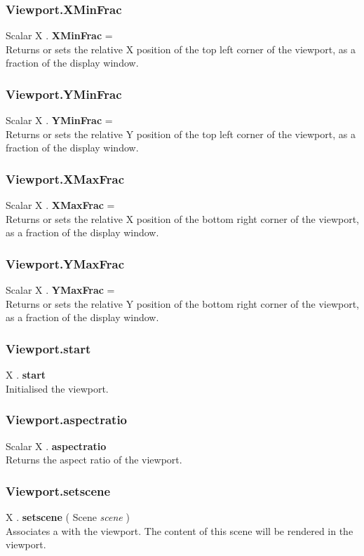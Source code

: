 \subsubsection{Viewport.XMinFrac \label{F:Viewport:XMinFrac}}
Scalar X . \textbf{XMinFrac} = \\
Returns or sets the relative X position of the top left corner of the viewport, as a fraction of the display window.

\subsubsection{Viewport.YMinFrac \label{F:Viewport:YMinFrac}}
Scalar X . \textbf{YMinFrac} = \\
Returns or sets the relative Y position of the top left corner of the viewport, as a fraction of the display window.

\subsubsection{Viewport.XMaxFrac \label{F:Viewport:XMaxFrac}}
Scalar X . \textbf{XMaxFrac} = \\
Returns or sets the relative X position of the bottom right corner of the viewport, as a fraction of the display window.

\subsubsection{Viewport.YMaxFrac \label{F:Viewport:YMaxFrac}}
Scalar X . \textbf{YMaxFrac} = \\
Returns or sets the relative Y position of the bottom right corner of the viewport, as a fraction of the display window.


\subsubsection{Viewport.start \label{F:Viewport:start}}
X . \textbf{start} \\
Initialised the viewport.

\subsubsection{Viewport.aspectratio \label{F:Viewport:aspectratio}}
Scalar X . \textbf{aspectratio} \\
Returns the aspect ratio of the viewport.

\subsubsection{Viewport.setscene \label{F:Viewport:setscene}}
X . \textbf{setscene} ( Scene \textit{scene} ) \\
Associates a  with the viewport. The content of this scene will be rendered in the viewport.

